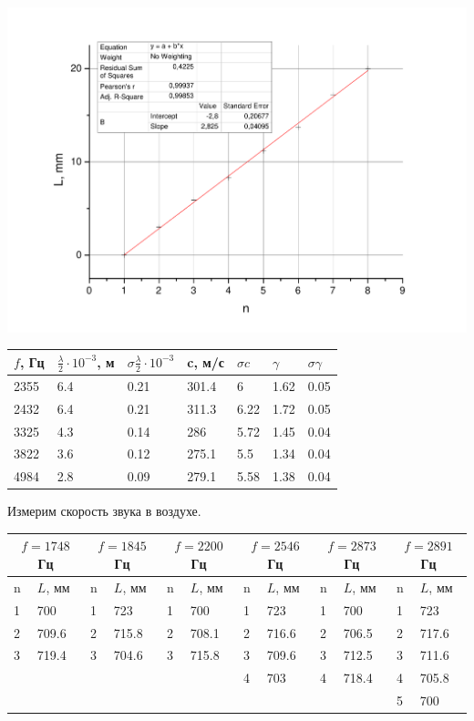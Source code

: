 \documentclass[a4paper,12pt]{article}
\begin{document}
		\includegraphics[width = 0.9\linewidth]{Graph5co2}
		
		\begin{center}
			\begin{tabular}{l | l | l | l | l | l | l}
				$f$, Гц & $\frac{\lambda}{2}\cdot 10^{-3}$, м & $\sigma\frac{\lambda}{2}\cdot 10^{-3}$ & c, м/с &$\sigma c$ & $\gamma$ & $\sigma\gamma$\\ \hline
				2355 & 6.4 & 0.21 & 301.4 & 6 & 1.62 & 0.05 \\ \hline
				2432 & 6.4 & 0.21 & 311.3 & 6.22 & 1.72 & 0.05\\ \hline
				3325 & 4.3 & 0.14 & 286 & 5.72 & 1.45 &  0.04 \\ \hline
				3822 & 3.6 & 0.12 & 275.1 & 5.5 & 1.34 &  0.04 \\ \hline
				4984 & 2.8 & 0.09 & 279.1 & 5.58 & 1.38 & 0.04  \\ \hline
			\end{tabular}
		\end{center}
		\newpage
		Измерим скорость звука в воздухе.
		\begin{center}
			\begin{tabular}{ l | l | l | l | l | l | l | l | l | l | l | l }
				\multicolumn{2}{|c}{$f=1748$ Гц} & \multicolumn{2}{|c}{$f=1845$ Гц} & \multicolumn{2}{|c}{$f=2200$ Гц} & \multicolumn{2}{|c}{$f=2546$ Гц}& \multicolumn{2}{|c}{$f=2873$ Гц}& \multicolumn{2}{|c}{$f=2891$ Гц}\\ \hline
				n & $L$, мм & n & $L$, мм & n & $L$, мм & n & $L$, мм & n & $L$, мм & n & $L$, мм \\ \hline
				1 & 700   & 1 & 723 & 1 & 700  & 1 & 723 & 1 & 700 & 1 & 723  \\ \hline
				2 & 709.6 & 2 & 715.8 & 2 & 708.1 & 2 & 716.6 & 2 & 706.5 & 2 & 717.6  \\ \hline
				3 & 719.4 & 3 & 704.6 & 3 & 715.8 & 3 & 709.6 & 3 & 712.5 & 3 & 711.6  \\ \hline
				&         &   &       &   &       & 4 & 703   & 4 & 718.4 & 4 & 705.8  \\ \hline
				&         &   &       &   &       &   &       &   &       & 5 & 700 \\ \hline
			\end{tabular}
		\end{center}
				
\end{document}
